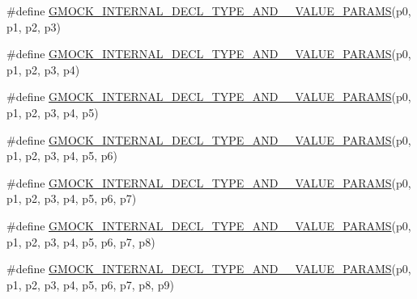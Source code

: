 \begin{DoxyCompactItemize}
\item 
\#define \mbox{\hyperlink{_obj__test_2lib_2googletest-master_2googlemock_2include_2gmock_2gmock-generated-actions_8h_aff64ba07ea8171eb7bacb655127120f7}{G\+M\+O\+C\+K\+\_\+\+I\+N\+T\+E\+R\+N\+A\+L\+\_\+\+D\+E\+C\+L\+\_\+\+T\+Y\+P\+E\+\_\+\+A\+N\+D\+\_\+\_\+\+V\+A\+L\+U\+E\+\_\+\+P\+A\+R\+A\+MS}}(p0,  p1,  p2,  p3)
\item 
\#define \mbox{\hyperlink{_obj__test_2lib_2googletest-master_2googlemock_2include_2gmock_2gmock-generated-actions_8h_a1f0b43fe98dabf52fa9dbffa0966d7f3}{G\+M\+O\+C\+K\+\_\+\+I\+N\+T\+E\+R\+N\+A\+L\+\_\+\+D\+E\+C\+L\+\_\+\+T\+Y\+P\+E\+\_\+\+A\+N\+D\+\_\+\_\+\+V\+A\+L\+U\+E\+\_\+\+P\+A\+R\+A\+MS}}(p0,  p1,  p2,  p3,  p4)
\item 
\#define \mbox{\hyperlink{_obj__test_2lib_2googletest-master_2googlemock_2include_2gmock_2gmock-generated-actions_8h_abffe20cc195c1f2a1682878bb7f7a35d}{G\+M\+O\+C\+K\+\_\+\+I\+N\+T\+E\+R\+N\+A\+L\+\_\+\+D\+E\+C\+L\+\_\+\+T\+Y\+P\+E\+\_\+\+A\+N\+D\+\_\+\_\+\+V\+A\+L\+U\+E\+\_\+\+P\+A\+R\+A\+MS}}(p0,  p1,  p2,  p3,  p4,  p5)
\item 
\#define \mbox{\hyperlink{_obj__test_2lib_2googletest-master_2googlemock_2include_2gmock_2gmock-generated-actions_8h_acb3b2a137310a0ac944d3695a0911a64}{G\+M\+O\+C\+K\+\_\+\+I\+N\+T\+E\+R\+N\+A\+L\+\_\+\+D\+E\+C\+L\+\_\+\+T\+Y\+P\+E\+\_\+\+A\+N\+D\+\_\+\_\+\+V\+A\+L\+U\+E\+\_\+\+P\+A\+R\+A\+MS}}(p0,  p1,  p2,  p3,  p4,  p5,  p6)
\item 
\#define \mbox{\hyperlink{_obj__test_2lib_2googletest-master_2googlemock_2include_2gmock_2gmock-generated-actions_8h_af6338728a5c12281280830ec7c5f685a}{G\+M\+O\+C\+K\+\_\+\+I\+N\+T\+E\+R\+N\+A\+L\+\_\+\+D\+E\+C\+L\+\_\+\+T\+Y\+P\+E\+\_\+\+A\+N\+D\+\_\+\_\+\+V\+A\+L\+U\+E\+\_\+\+P\+A\+R\+A\+MS}}(p0,  p1,  p2,  p3,  p4,  p5,  p6,  p7)
\item 
\#define \mbox{\hyperlink{_obj__test_2lib_2googletest-master_2googlemock_2include_2gmock_2gmock-generated-actions_8h_a27e84307ea95be9e2e4526cd6b34a151}{G\+M\+O\+C\+K\+\_\+\+I\+N\+T\+E\+R\+N\+A\+L\+\_\+\+D\+E\+C\+L\+\_\+\+T\+Y\+P\+E\+\_\+\+A\+N\+D\+\_\+\_\+\+V\+A\+L\+U\+E\+\_\+\+P\+A\+R\+A\+MS}}(p0,  p1,  p2,  p3,  p4,  p5,  p6,  p7,  p8)
\item 
\#define \mbox{\hyperlink{_obj__test_2lib_2googletest-master_2googlemock_2include_2gmock_2gmock-generated-actions_8h_a791e16a318652e43abb3c1aeba969d4d}{G\+M\+O\+C\+K\+\_\+\+I\+N\+T\+E\+R\+N\+A\+L\+\_\+\+D\+E\+C\+L\+\_\+\+T\+Y\+P\+E\+\_\+\+A\+N\+D\+\_\+\_\+\+V\+A\+L\+U\+E\+\_\+\+P\+A\+R\+A\+MS}}(p0,  p1,  p2,  p3,  p4,  p5,  p6,  p7,  p8,  p9)

\end{DoxyCompactItemize}
